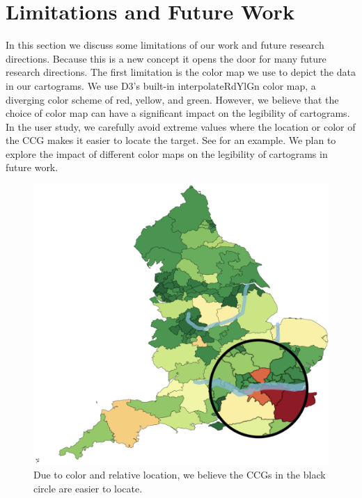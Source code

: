 \section{Limitations and Future Work}

In this section we discuss some limitations of our work and future research directions.
Because this is a new concept it opens the door for many future research directions.
The first limitation is the color map we use to depict the data in our cartograms. 
We use D3's built-in interpolateRdYlGn color map, a diverging color scheme of red, yellow, and green.
However, we believe that the choice of color map can have a significant impact on the legibility of cartograms.
In the user study, we carefully avoid extreme values where the location or color of the CCG makes it easier to locate the target.
See  for an example.
We plan to explore the impact of different color maps on the legibility of cartograms in future work.

{
    \begin{figure}[tb!]
        \centering
        \includegraphics[width=\columnwidth,keepaspectratio]{figure/limitations/extreme.png}
        \caption{Due to color and relative location, we believe the CCGs in the black circle are easier to locate.}
        \label{fig:extreme}
    \end{figure}
}

